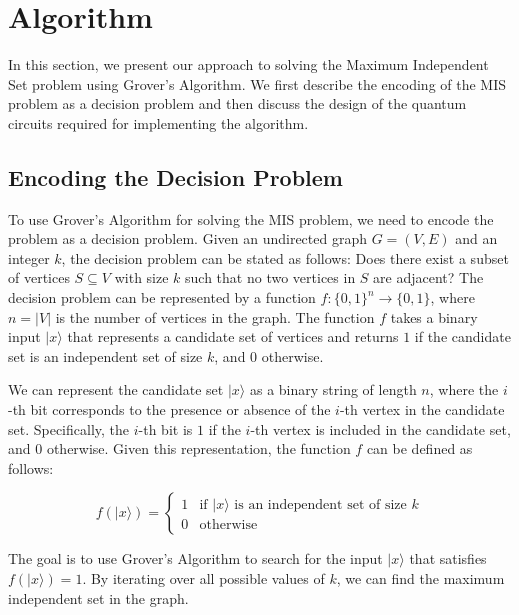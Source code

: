 \section{Algorithm}
\label{sec:algorithm}

In this section, we present our approach to solving the Maximum Independent Set problem using Grover's Algorithm. We first describe the encoding of the MIS problem as a decision problem and then discuss the design of the quantum circuits required for implementing the algorithm.

\subsection{Encoding the Decision Problem}
\label{subsec:encoding}

To use Grover's Algorithm for solving the MIS problem, we need to encode the problem as a decision problem. Given an undirected graph $G=(V, E)$ and an integer $k$, the decision problem can be stated as follows: Does there exist a subset of vertices $S \subseteq V$ with size $k$ such that no two vertices in $S$ are adjacent? The decision problem can be represented by a function $f: \{0, 1\}^n \rightarrow \{0, 1\}$, where $n = \vert V \vert$ is the number of vertices in the graph. The function $f$ takes a binary input $\vert x \rangle$ that represents a candidate set of vertices and returns $1$ if the candidate set is an independent set of size $k$, and $0$ otherwise.

We can represent the candidate set $\vert x \rangle$ as a binary string of length $n$, where the $i$-th bit corresponds to the presence or absence of the $i$-th vertex in the candidate set. Specifically, the $i$-th bit is $1$ if the $i$-th vertex is included in the candidate set, and $0$ otherwise. Given this representation, the function $f$ can be defined as follows:

\begin{equation}
    f(\vert x \rangle) = \begin{cases}
        1 & \text{if } \vert x \rangle \text{ is an independent set of size } k \\
        0 & \text{otherwise}
    \end{cases}
\end{equation}

The goal is to use Grover's Algorithm to search for the input $\vert x \rangle$ that satisfies $f(\vert x \rangle) = 1$. By iterating over all possible values of $k$, we can find the maximum independent set in the graph.

